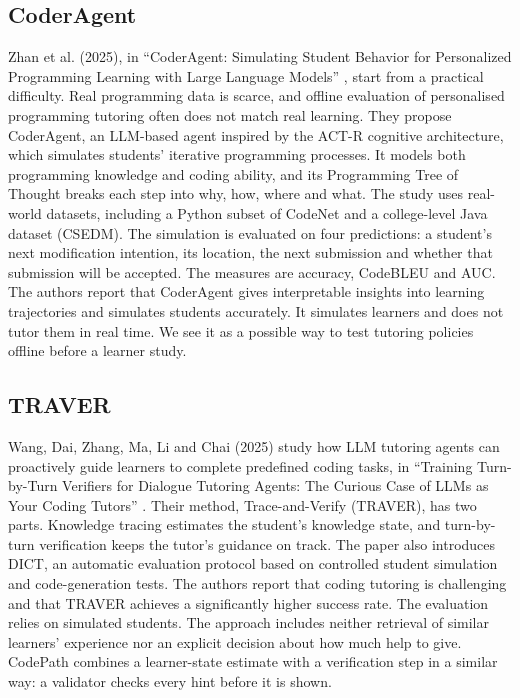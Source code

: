 \clearpage
\subsection{CoderAgent}
Zhan et al. (2025), in ``CoderAgent: Simulating Student Behavior for Personalized Programming Learning with Large Language Models'' \cite{zhan2025}, start from a practical difficulty. Real programming data is scarce, and offline evaluation of personalised programming tutoring often does not match real learning. They propose CoderAgent, an LLM-based agent inspired by the ACT-R cognitive architecture, which simulates students' iterative programming processes. It models both programming knowledge and coding ability, and its Programming Tree of Thought breaks each step into why, how, where and what. The study uses real-world datasets, including a Python subset of CodeNet and a college-level Java dataset (CSEDM). The simulation is evaluated on four predictions: a student's next modification intention, its location, the next submission and whether that submission will be accepted. The measures are accuracy, CodeBLEU and AUC. The authors report that CoderAgent gives interpretable insights into learning trajectories and simulates students accurately. It simulates learners and does not tutor them in real time. We see it as a possible way to test tutoring policies offline before a learner study.

\subsection{TRAVER}
Wang, Dai, Zhang, Ma, Li and Chai (2025) study how LLM tutoring agents can proactively guide learners to complete predefined coding tasks, in ``Training Turn-by-Turn Verifiers for Dialogue Tutoring Agents: The Curious Case of LLMs as Your Coding Tutors'' \cite{wang2025}. Their method, Trace-and-Verify (TRAVER), has two parts. Knowledge tracing estimates the student's knowledge state, and turn-by-turn verification keeps the tutor's guidance on track. The paper also introduces DICT, an automatic evaluation protocol based on controlled student simulation and code-generation tests. The authors report that coding tutoring is challenging and that TRAVER achieves a significantly higher success rate. The evaluation relies on simulated students. The approach includes neither retrieval of similar learners' experience nor an explicit decision about how much help to give. CodePath combines a learner-state estimate with a verification step in a similar way: a validator checks every hint before it is shown.


